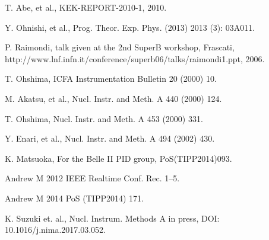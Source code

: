 \documentclass{llncs}
\begin{document}
\begin{thebibliography}{}

T. Abe, et al., KEK-REPORT-2010-1, 2010.

Y. Ohnishi, et al., Prog. Theor. Exp. Phys. (2013) 2013 (3): 03A011.

P. Raimondi, talk given at the 2nd SuperB workshop, Frascati,
http://www.lnf.infn.it/conference/superb06/talks/raimondi1.ppt,
2006.

T. Ohshima, ICFA Instrumentation Bulletin 20 (2000) 10.

M. Akatsu, et al., Nucl. Instr. and Meth. A 440 (2000) 124.

T. Ohshima, Nucl. Instr. and Meth. A 453 (2000) 331.

Y. Enari, et al., Nucl. Instr. and Meth. A 494 (2002) 430.

K. Matsuoka, For the Belle II PID group, PoS(TIPP2014)093.

Andrew M 2012 IEEE Realtime Conf. Rec. 1–5.

Andrew M 2014 PoS (TIPP2014) 171.

K. Suzuki et. al., Nucl. Instrum. Methods A in press, DOI:
10.1016/j.nima.2017.03.052.

\end{thebibliography}
\end{document}
